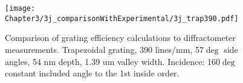 \begin{figure}[htbp] %
   \centering
   \texttt{[image: Chapter3/3j\_comparisonWithExperimental/3j\_trap390.pdf]} 
   \caption{Comparison of grating efficiency calculations to diffractometer measurements.  Trapezoidal grating, 390 lines/mm, 57$\deg$ side angles, 54 nm depth, 1.39 um valley width.  Incidence: 160$\deg$ constant included angle to the 1st inside order.}
   \label{3j-4}
\end{figure}
